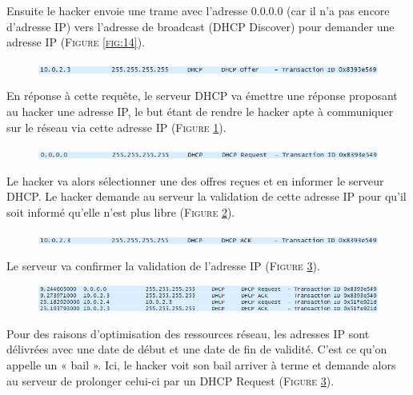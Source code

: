 \documentclass[11pt]{article}
\begin{document}
Ensuite le hacker envoie une trame avec l’adresse 0.0.0.0 (car il n’a pas encore d’adresse IP) vers l’adresse de broadcast (DHCP Discover) pour demander une adresse IP  (\textsc{Figure \ref{fig:14}}).

\begin{figure}[h!]
        \centering \includegraphics[scale=0.9]{Exo3/15.png}
        \caption{}
         \label{fig:15}
\end{figure}

En réponse à cette requête, le serveur DHCP va émettre une réponse proposant au hacker une adresse IP, le but étant de rendre le hacker apte à communiquer sur le réseau via cette adresse IP (\textsc{Figure \ref{fig:15}}).

\begin{figure}[h!]
        \centering \includegraphics[scale=0.9]{Exo3/16.png}
        \caption{}
        \label{fig:16}
\end{figure}

Le hacker va alors sélectionner une des offres reçues et en informer le serveur DHCP. Le hacker demande au serveur la validation de cette adresse IP pour qu’il soit informé qu’elle n’est plus libre (\textsc{Figure \ref{fig:16}}).
\vspace{2cm}
\begin{figure}[h!]
        \centering \includegraphics[scale=0.9]{Exo3/17.png}
        \caption{}
         \label{fig:17}
\end{figure}

Le serveur va confirmer la validation de l’adresse IP (\textsc{Figure \ref{fig:17}}).

\begin{figure}[h!]
        \centering \includegraphics[scale=0.9]{Exo3/18.png}
        \caption{}
         \label{fig:18}
\end{figure}

Pour des raisons d’optimisation des ressources réseau, les adresses IP sont délivrées avec une date de début et une date de fin de validité. C’est ce qu’on appelle un « bail ». Ici, le hacker voit son bail arriver à terme et demande alors au serveur de prolonger celui-ci par un DHCP Request (\textsc{Figure \ref{fig:17}}).
\end{document}

